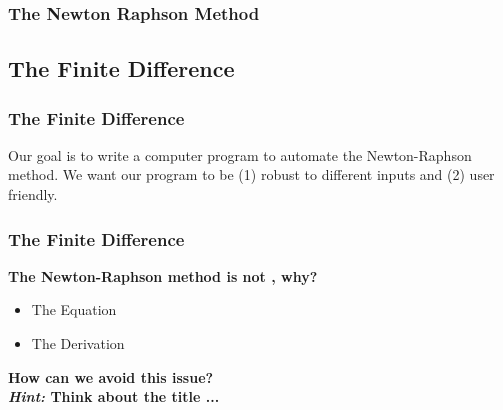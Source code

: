 \documentclass[fleqn]{beamer} %
\newcommand{\sectionIIsubsectionIIItitle}{The Newton Raphson Method}
\newcommand{\sectionIIsubsectionIVtitle}{The Finite Difference}
\begin{document}
			\begin{frame}
				\frametitle{\sectionIIsubsectionIIItitle}
				\bigskip

				\btVFill 
			\end{frame}

		\subsection{\sectionIIsubsectionIVtitle}\label{sectionIIsubsectionIV}

			\begin{frame}
				\frametitle{\sectionIIsubsectionIVtitle}
				\bigskip

				Our goal is to write a computer program to automate the Newton-Raphson method. We want our program to be (1) robust to different inputs and (2) user friendly. 

				\btVFill 
			\end{frame}

			\begin{frame}
				\frametitle{\sectionIIsubsectionIVtitle}
				\bigskip

				\textbf{The Newton-Raphson method is not \BK, why?} \\
				\begin{itemize}
					\item  The Equation\vspace{3mm}	\\
					\item  The Derivation\vspace{3mm}	\\
				\end{itemize}
				\textbf{How can we avoid this issue?} \vspace{10mm}\\

				\textbf{{\it Hint:} Think about the title  \BK ...} \vspace{10mm}\\

				\btVFill 
			\end{frame}
\end{document}
